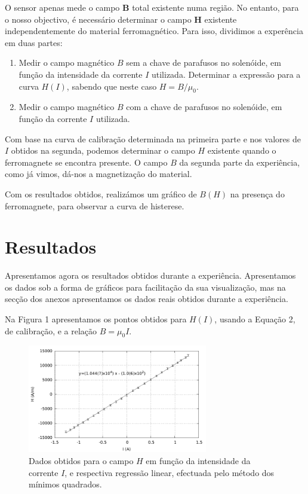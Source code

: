 \documentclass[a4paper]{article}
\begin{document}
O sensor apenas mede o campo \textbf{B} total existente numa região. No entanto, para o nosso objectivo, é necessário determinar o campo \textbf{H} existente independentemente do material ferromagnético. Para isso, dividimos a experência em duas partes:
\begin{enumerate}
\item Medir o campo magnético $B$ sem a chave de parafusos no solenóide, em função da intensidade da corrente $I$ utilizada.  Determinar a expressão para a curva $H(I)$, sabendo que neste caso $H=B/\mu_0$.
\item Medir o campo magnético $B$ com a chave de parafusos no solenóide, em função da corrente $I$ utilizada.
\end{enumerate}

Com base na curva de calibração determinada na primeira parte e nos valores de $I$ obtidos na segunda, podemos determinar o campo $H$ existente quando o ferromagnete se encontra presente. O campo $B$ da segunda parte da experiência, como já vimos, dá-nos a magnetização do material.

Com os resultados obtidos, realizámos um gráfico de $B(H)$ na presença do ferromagnete, para observar a curva de histerese.

\section{Resultados}
Apresentamos agora os resultados obtidos durante a experiência. Apresentamos os dados sob a forma de gráficos para facilitação da sua visualização, mas na secção dos anexos apresentamos os dados reais obtidos durante a experiência.

Na Figura 1 apresentamos os pontos obtidos para $H(I)$, usando a Equação 2, de calibração, e a relação $B=\mu_0 I$.

\begin{figure}[htbp]
\centering
\includegraphics[width=0.7\textwidth]{./Imagens/grafico1.pdf}
\caption{Dados obtidos para o campo $H$ em função da intensidade da corrente $I$, e respectiva regressão linear, efectuada pelo método dos mínimos quadrados.}
\end{figure}
\end{document}
